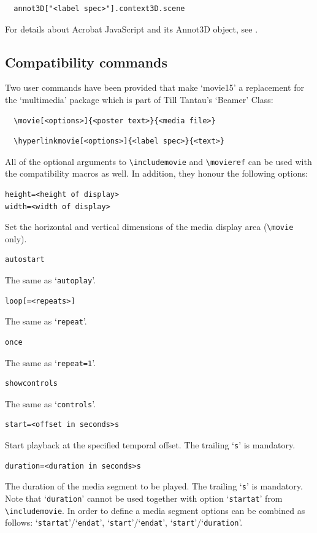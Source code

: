 \documentclass[a4paper]{article}
\begin{document}
\begin{verbatim}
  annot3D["<label spec>"].context3D.scene
\end{verbatim}
For details about Acrobat JavaScript and its Annot3D object, see \cite{jscript}.

\subsection{Compatibility commands}
Two user commands have been provided that make `movie15' a replacement for the `multimedia' package which is part of Till Tantau's `Beamer' Class:
\begin{verbatim}
  \movie[<options>]{<poster text>}{<media file>}
\end{verbatim}
\begin{verbatim}
  \hyperlinkmovie[<options>]{<label spec>}{<text>}
\end{verbatim}
All of the optional arguments to \verb+\includemovie+ and \verb+\movieref+ can be used with the compatibility macros as well. In addition, they honour the following options:
\begin{verbatim}
height=<height of display>
width=<width of display>
\end{verbatim}
Set the horizontal and vertical dimensions of the media display area (\verb+\movie+ only).
\begin{verbatim}
autostart
\end{verbatim}
The same as `\verb+autoplay+'.
\begin{verbatim}
loop[=<repeats>]
\end{verbatim}
The same as `\verb+repeat+'.
\begin{verbatim}
once
\end{verbatim}
The same as `\verb+repeat=1+'.
\begin{verbatim}
showcontrols
\end{verbatim}
The same as `\verb+controls+'.
\begin{verbatim}
start=<offset in seconds>s
\end{verbatim}
Start playback at the specified temporal offset. The trailing `\verb+s+' is mandatory.
\begin{verbatim}
duration=<duration in seconds>s
\end{verbatim}
The duration of the media segment to be played. The trailing `\verb+s+' is mandatory. Note that `\verb+duration+' cannot be used together with option `\verb+startat+' from \verb+\includemovie+. In order to define a media segment options can be combined as follows: `\verb+startat+'/`\verb+endat+', `\verb+start+'/`\verb+endat+', `\verb+start+'/`\verb+duration+'.
\end{document}
